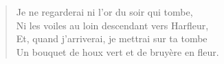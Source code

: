 \begin{verse}


Je ne regarderai ni l'or du soir qui tombe,\\
Ni les voiles au loin descendant vers Harfleur,\\
Et, quand j'arriverai, je mettrai sur ta tombe\\
Un bouquet de houx vert et de bruyère en fleur.

\end{verse}
